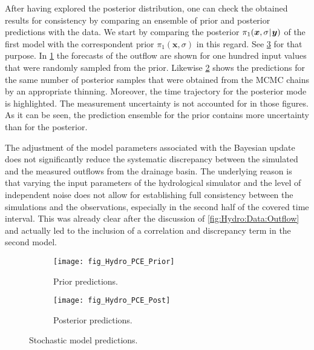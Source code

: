 \par %
After having explored the posterior distribution, one can check the obtained results for consistency by comparing an ensemble of prior and posterior predictions with the data.
We start by comparing the posterior \(\pi_1(\bm{x},\sigma {\:\!}|{\:\!} \bm{y})\) of the first model with the correspondent prior \(\pi_1(\bm{x},\sigma)\) in this regard.
See \cref{fig:Hydro:PCE} for that purpose.
In \cref{fig:Hydro:PCE:Prior} the forecasts of the outflow are shown for one hundred input values that were randomly sampled from the prior.
Likewise \cref{fig:Hydro:PCE:Posterior} shows the predictions for the same number of posterior samples that were obtained from the MCMC chains by an appropriate thinning.
Moreover, the time trajectory for the posterior mode is highlighted.
The measurement uncertainty is not accounted for in those figures.
As it can be seen, the prediction ensemble for the prior contains more uncertainty than for the posterior.
\par %
The adjustment of the model parameters associated with the Bayesian update does not significantly reduce
the systematic discrepancy between the simulated and the measured outflows from the drainage basin.
The underlying reason is that varying the input parameters of the hydrological simulator and the level of independent noise
does not allow for establishing full consistency between the simulations and the observations, especially in the second half of the covered time interval.
This was already clear after the discussion of \cref{fig:Hydro:Data:Outflow} and actually led to the inclusion of a correlation and discrepancy term in the second model.
\begin{figure}[htbp]
  \centering
  \begin{subfigure}[b]{\HYDROsubWidth}
    \centering
    \texttt{[image: fig\_Hydro\_PCE\_Prior]}
    \caption{Prior predictions.}
    \label{fig:Hydro:PCE:Prior}
  \end{subfigure}\hfill%
  \begin{subfigure}[b]{\HYDROsubWidth}
    \centering
    \texttt{[image: fig\_Hydro\_PCE\_Post]}
    \caption{Posterior predictions.}
    \label{fig:Hydro:PCE:Posterior}
  \end{subfigure}%
  \caption[Stochastic model predictions]{Stochastic model predictions.}
  \label{fig:Hydro:PCE}
\end{figure}
\par %
